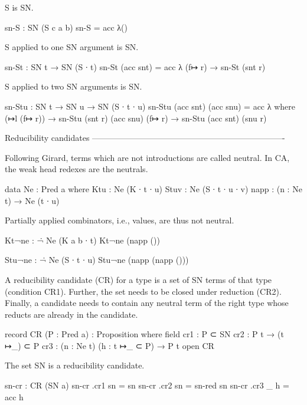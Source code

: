 S is SN.

\begin{code}
sn-S : SN (S {c} {a} {b})
sn-S = acc λ()
\end{code}

S applied to one SN argument is SN.

\begin{code}
sn-St : SN t → SN (S ∙ t)
sn-St (acc snt) = acc λ{ (f↦ r) → sn-St (snt r) }
\end{code}

S applied to two SN arguments is SN.

\begin{code}
sn-Stu : SN t → SN u → SN (S ∙ t ∙ u)
sn-Stu (acc snt) (acc snu) = acc λ where
  (↦l (f↦ r))  → sn-Stu (snt r) (acc snu)
  (f↦ r)       → sn-Stu (acc snt) (snu r)
\end{code}

Reducibility candidates
----------------------------------------------------------------------

Following Girard, terms which are not introductions are called neutral.
In CA, the weak head redexes are the neutrals.

\begin{code}
data Ne : Pred a where
  Ktu   : Ne (K ∙ t ∙ u)
  Stuv  : Ne (S ∙ t ∙ u ∙ v)
  napp  : (n : Ne t) → Ne (t ∙ u)
\end{code}

Partially applied combinators, i.e., values, are thus not neutral.

\begin{code}
Kt¬ne : ¬̇ Ne (K {a} {b} ∙ t)
Kt¬ne (napp ())

Stu¬ne : ¬̇ Ne (S ∙ t ∙ u)
Stu¬ne (napp (napp ()))
\end{code}

A reducibility candidate (CR) for a type is a set of SN terms of that type
(condition CR1).
Further, the set needs to be closed under reduction (CR2).
Finally, a candidate needs to contain any neutral term of the right type
whose reducts are already in the candidate.

\begin{code}
record CR (P : Pred a) : Proposition where
  field
    cr1  : P ⊂ SN
    cr2  : P t → (t ↦_) ⊂ P
    cr3  : (n : Ne t) (h : t ↦_ ⊂ P) → P t
open CR
\end{code}

The set SN is a reducibility candidate.

\begin{code}
sn-cr : CR (SN {a})
sn-cr .cr1 sn   = sn
sn-cr .cr2 sn   = sn-red sn
sn-cr .cr3 _ h  = acc h
\end{code}


